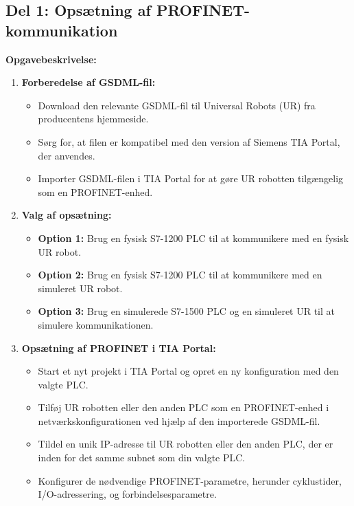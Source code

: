 \subsection{Del 1: Opsætning af PROFINET-kommunikation}
\textbf{Opgavebeskrivelse:}
\begin{enumerate}
	\item \textbf{Forberedelse af GSDML-fil:}
	\begin{itemize}
		\item Download den relevante GSDML-fil til Universal Robots (UR) fra producentens hjemmeside.
		\item Sørg for, at filen er kompatibel med den version af Siemens TIA Portal, der anvendes.
		\item Importer GSDML-filen i TIA Portal for at gøre UR robotten tilgængelig som en PROFINET-enhed.
	\end{itemize}
	
	\item \textbf{Valg af opsætning:}
	\begin{itemize}
		\item \textbf{Option 1:} Brug en fysisk S7-1200 PLC til at kommunikere med en fysisk UR robot.
		\item \textbf{Option 2:} Brug en fysisk S7-1200 PLC til at kommunikere med en simuleret UR robot.
		\item \textbf{Option 3:} Brug en simulerede S7-1500 PLC og en simuleret UR til at simulere kommunikationen.
	\end{itemize}
	
	\item \textbf{Opsætning af PROFINET i TIA Portal:}
	\begin{itemize}
		\item Start et nyt projekt i TIA Portal og opret en ny konfiguration med den valgte PLC.
		\item Tilføj UR robotten eller den anden PLC som en PROFINET-enhed i netværkskonfigurationen ved hjælp af den importerede GSDML-fil.
		\item Tildel en unik IP-adresse til UR robotten eller den anden PLC, der er inden for det samme subnet som din valgte PLC.
		\item Konfigurer de nødvendige PROFINET-parametre, herunder cyklustider, I/O-adressering, og forbindelsesparametre.
	\end{itemize}
	

\end{enumerate}
